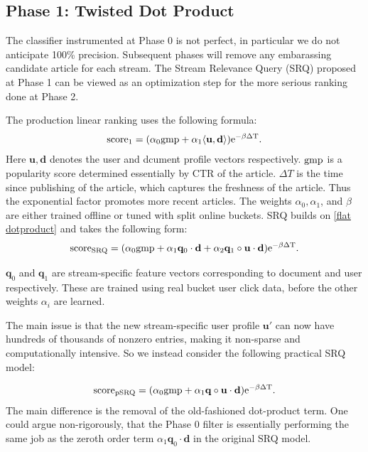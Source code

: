 \documentclass{sig-alternate}
\newcommand{\bfd}{\mathbf{d}}
\newcommand{\bfu}{\mathbf{u}}
\newcommand{\bfq}{\mathbf{q}}
\begin{document}
\subsection{Phase 1: Twisted Dot Product}
\label{sec:phase1 ranking}

The classifier instrumented at Phase 0 is not perfect, in particular we do not 
anticipate 100\% precision. Subsequent phases will remove any embarassing 
candidate article for each stream. The Stream Relevance Query (SRQ) proposed 
at Phase 1 can be viewed as an optimization step for the more serious ranking 
done at Phase 2. 

The production linear ranking uses the following formula:
\begin{align} \label{flat dotproduct}
\rm{score}_1 =  (\alpha_0  \rm{gmp} + \alpha_1  \langle \bfu,\bfd\rangle ) e^{-\beta \Delta T}.
\end{align}
Here $\bfu,\bfd$ denotes the user and dcument profile vectors respectively. 
$\rm{gmp}$ is a popularity score determined essentially by CTR of the article. 
$\Delta T$ is the time since publishing of the article, which captures the 
freshness of the article. Thus the exponential factor promotes more recent 
articles. The weights $\alpha_0, \alpha_1$, and $\beta$ are either trained 
offline or tuned with split online buckets. SRQ builds on \eqref{flat 
dotproduct} and takes the following form:
\begin{align} \label{original SRQ}
\rm{score}_{\rm{SRQ}} = (\alpha_0 \rm{gmp} + \alpha_1 \bfq_0 \cdot \bfd + \alpha_2 \bfq_1 \circ \bfu \cdot \bfd ) e^{-\beta \Delta T}.
\end{align}

$\bfq_0 $ and $\bfq_1$ are stream-specific feature vectors corresponding to 
document and user respectively. These are trained using real bucket user click 
data, before the other weights $\alpha_i$ are learned.  

The main issue is that the new stream-specific user 
profile $\bfu'$ can now have hundreds of thousands of nonzero entries, making 
it non-sparse and computationally intensive. So we instead consider the 
following practical SRQ model:

\begin{align} \label{practical SRQ}
\rm{score}_{\rm{pSRQ}} = (\alpha_0  \rm{gmp} + \alpha_1 \bfq \circ \bfu \cdot \bfd) e^{-\beta \Delta T}.
\end{align}
The main difference is the removal of the old-fashioned dot-product term. One could argue non-rigorously, that the Phase 0 filter is essentially performing the same job as the zeroth order term $\alpha_1 \bfq_0 \cdot \bfd$ in the original SRQ model. 
\end{document}
